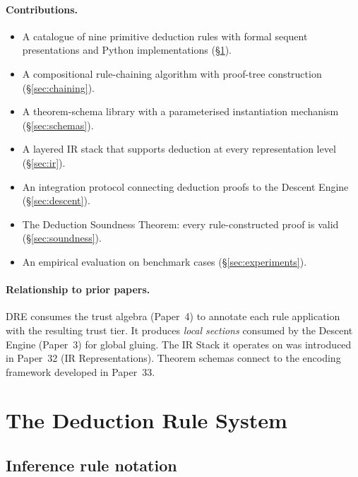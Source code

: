 \documentclass[11pt]{article}
\begin{document}
\paragraph{Contributions.}
\begin{itemize}[leftmargin=2em]
  \item A catalogue of nine primitive deduction rules with formal
    sequent presentations and Python implementations (§\ref{sec:rules}).
  \item A compositional rule-chaining algorithm with proof-tree
    construction (§\ref{sec:chaining}).
  \item A theorem-schema library with a parameterised instantiation
    mechanism (§\ref{sec:schemas}).
  \item A layered IR stack that supports deduction at every
    representation level (§\ref{sec:ir}).
  \item An integration protocol connecting deduction proofs to the
    Descent Engine (§\ref{sec:descent}).
  \item The Deduction Soundness Theorem: every rule-constructed proof
    is valid (§\ref{sec:soundness}).
  \item An empirical evaluation on \numcases{} benchmark cases
    (§\ref{sec:experiments}).
\end{itemize}

\paragraph{Relationship to prior papers.}
\textsc{DRE} consumes the trust algebra (Paper~4) to annotate each
rule application with the resulting trust tier.  It produces
\emph{local sections} consumed by the Descent Engine (Paper~3) for
global gluing.  The IR Stack it operates on was introduced in
Paper~32 (IR Representations).  Theorem schemas connect to the
encoding framework developed in Paper~33.

\section{The Deduction Rule System}\label{sec:rules}

\subsection{Inference rule notation}
\end{document}
